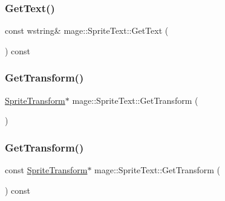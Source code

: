 \subsubsection{\texorpdfstring{Get\+Text()}{GetText()}}
{\footnotesize\ttfamily const wstring\& mage\+::\+Sprite\+Text\+::\+Get\+Text (\begin{DoxyParamCaption}{ }\end{DoxyParamCaption}) const}

\hypertarget{classmage_1_1_sprite_text_a1ba88df7fac17dc88d958fa4a841b7f1}{}\label{classmage_1_1_sprite_text_a1ba88df7fac17dc88d958fa4a841b7f1} 
\subsubsection{\texorpdfstring{Get\+Transform()}{GetTransform()}\hspace{0.1cm}{\footnotesize\ttfamily [1/2]}}
{\footnotesize\ttfamily \hyperlink{structmage_1_1_sprite_transform}{Sprite\+Transform}$\ast$ mage\+::\+Sprite\+Text\+::\+Get\+Transform (\begin{DoxyParamCaption}{ }\end{DoxyParamCaption})}

\hypertarget{classmage_1_1_sprite_text_a6e2baafdb30e47405f6199ca24194934}{}\label{classmage_1_1_sprite_text_a6e2baafdb30e47405f6199ca24194934} 
\subsubsection{\texorpdfstring{Get\+Transform()}{GetTransform()}\hspace{0.1cm}{\footnotesize\ttfamily [2/2]}}
{\footnotesize\ttfamily const \hyperlink{structmage_1_1_sprite_transform}{Sprite\+Transform}$\ast$ mage\+::\+Sprite\+Text\+::\+Get\+Transform (\begin{DoxyParamCaption}{ }\end{DoxyParamCaption}) const}

\hypertarget{classmage_1_1_sprite_text_a648398498414155f5072c771dca1a031}{}\label{classmage_1_1_sprite_text_a648398498414155f5072c771dca1a031} 
